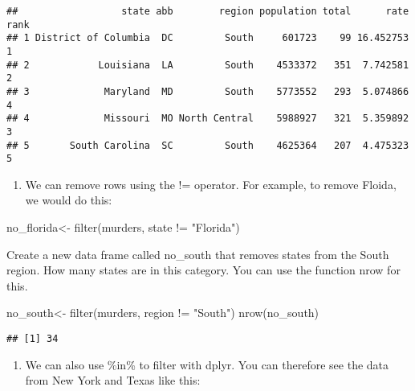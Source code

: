 \documentclass[
]{article}
\newenvironment{Shaded}{\begin{snugshade}}{\end{snugshade}}
\newcommand{\FunctionTok}[1]{\textcolor[rgb]{0.00,0.00,0.00}{#1}}
\newcommand{\NormalTok}[1]{#1}
\newcommand{\OtherTok}[1]{\textcolor[rgb]{0.56,0.35,0.01}{#1}}
\newcommand{\SpecialCharTok}[1]{\textcolor[rgb]{0.00,0.00,0.00}{#1}}
\newcommand{\StringTok}[1]{\textcolor[rgb]{0.31,0.60,0.02}{#1}}
\providecommand{\tightlist}{%
  \setlength{\itemsep}{0pt}\setlength{\parskip}{0pt}}
\begin{document}
\begin{verbatim}
##                  state abb        region population total      rate rank
## 1 District of Columbia  DC         South     601723    99 16.452753    1
## 2            Louisiana  LA         South    4533372   351  7.742581    2
## 3             Maryland  MD         South    5773552   293  5.074866    4
## 4             Missouri  MO North Central    5988927   321  5.359892    3
## 5       South Carolina  SC         South    4625364   207  4.475323    5
\end{verbatim}

\begin{enumerate}
\def\labelenumi{\arabic{enumi}.}
\setcounter{enumi}{4}
\tightlist
\item
  We can remove rows using the != operator. For example, to remove
  Floida, we would do this:
\end{enumerate}

\begin{Shaded}
\begin{Highlighting}[]
\NormalTok{no\_florida}\OtherTok{\textless{}{-}} \FunctionTok{filter}\NormalTok{(murders, state }\SpecialCharTok{!=} \StringTok{"Florida"}\NormalTok{)}
\end{Highlighting}
\end{Shaded}

Create a new data frame called no\_south that removes states from the
South region. How many states are in this category. You can use the
function nrow for this.

\begin{Shaded}
\begin{Highlighting}[]
\NormalTok{no\_south}\OtherTok{\textless{}{-}} \FunctionTok{filter}\NormalTok{(murders, region }\SpecialCharTok{!=} \StringTok{"South"}\NormalTok{)}
\FunctionTok{nrow}\NormalTok{(no\_south)}
\end{Highlighting}
\end{Shaded}

\begin{verbatim}
## [1] 34
\end{verbatim}

\begin{enumerate}
\def\labelenumi{\arabic{enumi}.}
\setcounter{enumi}{5}
\tightlist
\item
  We can also use \%in\% to filter with dplyr. You can therefore see the
  data from New York and Texas like this:
\end{enumerate}
\end{document}
